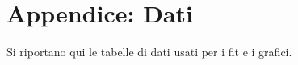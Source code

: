 \documentclass[10pt,a4paper]{article}
\begin{document}
\section{Appendice: Dati}
Si riportano qui le tabelle di dati usati per i fit e i grafici.


\begin{figure}[h]
	\centering
		\begin{minipage}[c]{0.4\textwidth}
	\centering
	
	\label{tensione}
		\end{minipage}
	\begin{minipage}[c]{0.4\textwidth}
		\centering
			
		\label{frequenza}
		\centering
			
		\label{guadagno}
	\end{minipage}
\end{figure}
\end{document}
